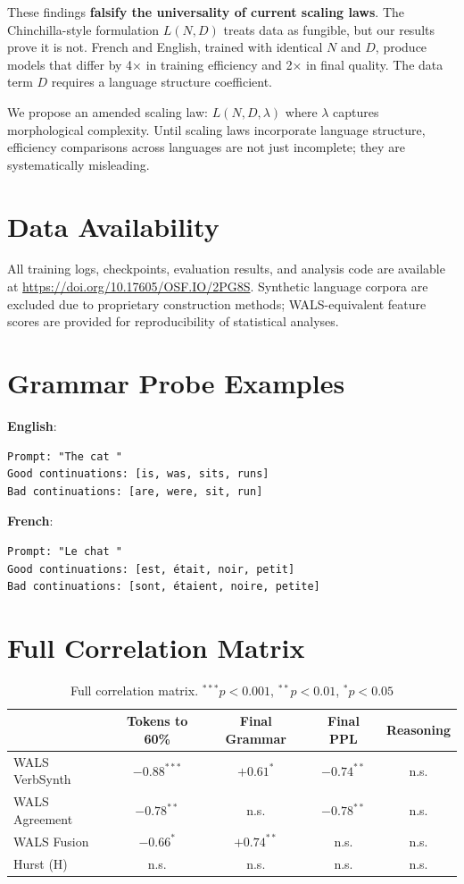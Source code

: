 \documentclass[11pt]{article}
\begin{document}
These findings \textbf{falsify the universality of current scaling laws}. The Chinchilla-style formulation $L(N,D)$ treats data as fungible, but our results prove it is not. French and English, trained with identical $N$ and $D$, produce models that differ by 4× in training efficiency and 2× in final quality. The data term $D$ requires a language structure coefficient.

We propose an amended scaling law: $L(N, D, \lambda)$ where $\lambda$ captures morphological complexity. Until scaling laws incorporate language structure, efficiency comparisons across languages are not just incomplete; they are systematically misleading.

\section*{Data Availability}

All training logs, checkpoints, evaluation results, and analysis code are available at \url{https://doi.org/10.17605/OSF.IO/2PG8S}. Synthetic language corpora are excluded due to proprietary construction methods; WALS-equivalent feature scores are provided for reproducibility of statistical analyses.

\appendix

\section{Grammar Probe Examples}

\textbf{English}:
\begin{verbatim}
Prompt: "The cat "
Good continuations: [is, was, sits, runs]
Bad continuations: [are, were, sit, run]
\end{verbatim}

\textbf{French}:
\begin{verbatim}
Prompt: "Le chat "
Good continuations: [est, était, noir, petit]
Bad continuations: [sont, étaient, noire, petite]
\end{verbatim}

\section{Full Correlation Matrix}

\begin{table}[h]
\centering
\small
\begin{tabular}{lcccc}
\toprule
& Tokens to 60\% & Final Grammar & Final PPL & Reasoning \\
\midrule
WALS VerbSynth & $-0.88^{***}$ & $+0.61^{*}$ & $-0.74^{**}$ & n.s. \\
WALS Agreement & $-0.78^{**}$ & n.s. & $-0.78^{**}$ & n.s. \\
WALS Fusion & $-0.66^{*}$ & $+0.74^{**}$ & n.s. & n.s. \\
Hurst (H) & n.s. & n.s. & n.s. & n.s. \\
\bottomrule
\end{tabular}
\caption{Full correlation matrix. $^{***}p<0.001$, $^{**}p<0.01$, $^{*}p<0.05$}
\end{table}
\end{document}
